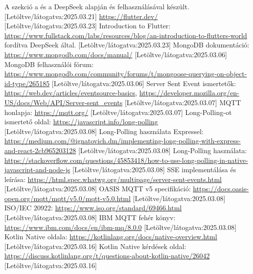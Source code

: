 \documentclass{thesis-ekf}
\theoremstyle{definition}
\theoremstyle{remark}
\begin{document}
\begin{thebibliography}{8}
	A szekció a \href{https://blockchainsimplified.com/blog/mongodb-introduction/}{\color{blue}{Blockchain Simplified}} és a DeepSeek alapján és felhasználásával készült.
	[Letöltve/látogatva:2025.03.21]
	\url{https://flutter.dev/}
	[Letöltve/látogatva:2025.03.23]
	Introduction to Flutter: \url{https://www.fullstack.com/labs/resources/blog/an-introduction-to-flutters-world} fordítva DeepSeek által.
	[Letöltve/látogatva:2025.03.23]
	MongoDB dokumentáció: \url{https://www.mongodb.com/docs/manual/} [Letöltve/látogatva:2025.03.06]
	MongoDB felhasználói fórum: \url{https://www.mongodb.com/community/forums/t/mongoose-querying-on-object-id-type/265185}
	[Letöltve/látogatva:2025.03.06]
	Server Sent Event ismertetők: \url{https://web.dev/articles/eventsource-basics}, \url{https://developer.mozilla.org/en-US/docs/Web/API/Server-sent_events}
	[Letöltve/látogatva:2025.03.07]
	 MQTT honlapja: \url{https://mqtt.org/}
	[Letöltve/látogatva:2025.03.07]
	 Long-Polling-ot ismertető oldal: \url{https://javascript.info/long-polling}
	[Letöltve/látogatva:2025.03.08]
	 Long-Polling használata Expressel: \url{https://medium.com/@ignatovich.dm/implementing-long-polling-with-express-and-react-2cb965203128}
	[Letöltve/látogatva:2025.03.08]
	 Long-Polling használata: \url{https://stackoverflow.com/questions/45853418/how-to-use-long-polling-in-native-javascript-and-node-js}
	[Letöltve/látogatva:2025.03.08]
	 SSE implementálása és leírása: \url{https://html.spec.whatwg.org/multipage/server-sent-events.html}
	[Letöltve/látogatva:2025.03.08]
	OASIS MQTT v5 specifikáció: \url{https://docs.oasis-open.org/mqtt/mqtt/v5.0/mqtt-v5.0.html}
	[Letöltve/látogatva:2025.03.08]
	 ISO/IEC 20922: \url{https://www.iso.org/standard/69466.html}
	[Letöltve/látogatva:2025.03.08]
	 IBM MQTT fehér könyv: \url{https://www.ibm.com/docs/en/ibm-mq/8.0.0}
	[Letöltve/látogatva:2025.03.08]
	 Kotlin Native oldala: \url{https://kotlinlang.org/docs/native-overview.html}
	[Letöltve/látogatva:2025.03.16]
	 Kotlin Native kérdések oldal: \url{https://discuss.kotlinlang.org/t/questions-about-kotlin-native/26042}
	[Letöltve/látogatva:2025.03.16]

\end{thebibliography}
\end{document}
